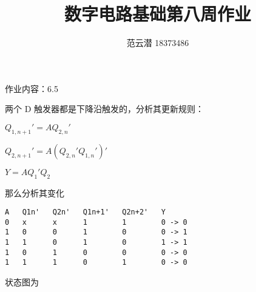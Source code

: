 \documentclass[lang=cn,11pt,a4paper,cite=authoryear]{elegantpaper}
\title{数字电路基础\quad 第八周作业}
\author{范云潜 18373486}
\institute{微电子学院 184111 班}
\date{\zhtoday}
\begin{document}
\maketitle

作业内容：6.5


两个 D 触发器都是下降沿触发的，分析其更新规则：

\(Q_{1,n+1}' = A Q_{2,n}'\) 

\(Q_{2,n+1}' = A (Q_{2,n}' Q_{1,n}')'\)

\(Y = A Q_1' Q_2\)

那么分析其变化

\begin{lstlisting}
A   Q1n'   Q2n'   Q1n+1'   Q2n+2'   Y 
0   x      x      1        1        0 -> 0 
1   0      0      1        0        0 -> 1
1   1      0      1        0        1 -> 1 
1   0      1      0        0        0 -> 0 
1   1      1      0        1        0 -> 0
\end{lstlisting}

状态图为 



\end{document}
